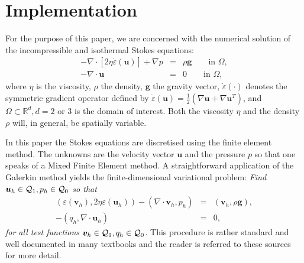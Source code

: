 \documentclass[a4paper]{article}
\begin{document}







\section{Implementation}


For the purpose of this paper, we are concerned with the numerical solution of 
the incompressible and isothermal Stokes equations:
\begin{eqnarray}
-\nabla \cdot \left[ 2\eta \dot\varepsilon({\bm u}) \right] + \nabla p &=& \rho \bm g \qquad  \textrm{in $\Omega$},
\label{eq:conv_momentum}  \\  
-\nabla \cdot {\bm u} &=& 0    \qquad    \textrm{in $\Omega$},   \label{eq:conv_mass} 
\end{eqnarray}
where $\eta$ is the viscosity, $\rho$ the density, ${\bm g}$ the gravity vector, $\dot\varepsilon(\cdot)$
denotes the symmetric gradient operator defined by $\dot\varepsilon({\bm u})
=\frac 12 (\nabla {\bm u} + \nabla {\bm u}^{T})$, 
and $\Omega\subset{\mathbb R}^d, d=2\text{ or }3$ is the domain
of interest. Both the viscosity $\eta$
and the density $\rho$ will, in general, be spatially variable.

In this paper the Stokes equations are discretised using the finite element method.
The unknowns are the velocity vector ${\bm u}$ and the pressure $p$ so that 
one speaks of a Mixed Finite Element method. 
A straightforward application of the Galerkin method yields the finite-dimensional 
variational problem: 
\textit{Find ${\bm u}_h\in {\cal Q}_1,p_h\in {\cal Q}_0$
so that
\begin{eqnarray}
\label{eq:discrete-formulation}
\left(\varepsilon(\bm v_h), 2\eta \varepsilon(\bm u_h)\right)  - ( \nabla \cdot \bm v_h, p_h) &=&   ({\bm v}_h,\rho \bm g),\\
-(q_h,\nabla \cdot \bm u_h) &=& 0,
\end{eqnarray}
for all test functions ${\bm v}_h\in {\cal Q}_1, q_h\in {\cal Q}_0$.}
This procedure is rather standard and well documented in many 
textbooks \cite{grsa,dohu03,bobf13} and the reader is referred to these sources 
for more detail.
\end{document}
